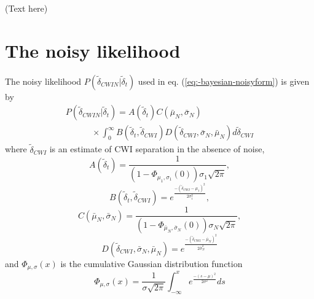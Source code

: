 \documentclass[extra]{gji}
\begin{document}
\begin{acknowledgments}
(Text here)
\end{acknowledgments}







\appendix

\section{The noisy likelihood}
\label{sec-Appendix-noisylikelihood}

The noisy likelihood $P(\widetilde{\delta}_{CWIN}|\widetilde{\delta}_t)$
used in eq. (\ref{eq:-bayesian-noisyform}) is given by
\begin{equation}
\begin{array}{l}
\label{eq-likelihood-int}
P(\widetilde{\delta}_{CWIN}|\widetilde{\delta}_t)  =
A(\widetilde{\delta}_t) C(\bar{\mu}_N, \bar{\sigma}_N)  \\
\hspace{3em} \times \int_0^\infty
B(\widetilde{\delta}_t,\widetilde{\delta}_{CWI})
D(\widetilde{\delta}_{CWI},\bar{\sigma}_N,\bar{\mu}_N )
d\widetilde{\delta}_{CWI}
\end{array}
\end{equation}
where $\widetilde{\delta}_{CWI}$ is an estimate of CWI separation in the absence
of noise,
\begin{equation}
\label{eq:Adefn}
A(\widetilde{\delta}_t) = \frac{1}{(1-\Phi_{\mu_1,\sigma_1}(0))\sigma_1\sqrt{2\pi} },
\end{equation}
\begin{equation}
B(\widetilde{\delta}_t,\widetilde{\delta}_{CWI})=e^{  \frac{-(\widetilde{\delta}_{CWI}-\mu_1)^2}{2\sigma_1^2} },
\end{equation}
\begin{equation}
\label{eq:Cdefn}
C(\bar{\mu}_N, \bar{\sigma}_N) =  \frac{1}{(1-\Phi_{\bar{\mu}_N,\bar{\sigma}_N}(0))\sigma_N\sqrt{2\pi}},
\end{equation}
\begin{equation}
D(\widetilde{\delta}_{CWI},\bar{\sigma}_N,\bar{\mu}_N )=e^{  \frac{-(\widetilde{\delta}_{CWI}-\bar{\mu}_N)^2}{2 \bar{\sigma}_N ^2} }
\end{equation}
and $\Phi_{\mu,\sigma}(x)$ is the cumulative Gaussian distribution function
\begin{equation}
\label{eq-cummulative-Gaussian}
\Phi_{\mu,\sigma}(x) = \frac{1}{\sigma \sqrt{2 \pi}}
\int_{-\infty}^x e^{  \frac{-(s-\mu)^2}{2\sigma^2}  } ds
\end{equation}
\end{document}
